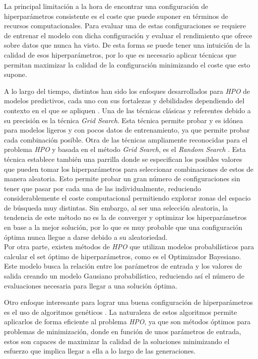 La principal limitación a la hora de encontrar una configuración de hiperparámetros consistente es el coste que puede suponer en términos de recursos computacionales. Para evaluar una de estas configuraciones se requiere de entrenar el modelo con dicha configuración y evaluar el rendimiento que ofrece sobre datos que nunca ha visto. De esta forma se puede tener una intuición de la calidad de esos hiperparámetros, por lo que es necesario aplicar técnicas que permitan maximizar la calidad de la configuración minimizando el coste que esto supone.


A lo largo del tiempo, distintos han sido los enfoques desarrollados para \textit{HPO} de modelos predictivos, cada uno con sus fortalezas y debilidades dependiendo del contexto en el que se apliquen \cite{yu2020hyperparameter}. Una de las técnicas clásicas y referentes debido a su precisión es la técnica \textit{Grid Search}. Esta técnica permite probar y es idónea para modelos ligeros y con pocos datos de entrenamiento, ya que permite probar cada combinación posible. Otra de las técnicas ampliamente reconocidas para el problema \textit{HPO} y basada en el método \textit{Grid Search}, es el \textit{Random Search} \cite{bergstra2012random}. Esta técnica establece también una parrilla donde se especifican los posibles valores que pueden tomar los hiperparámetros para seleccionar combinaciones de estos de manera aleatoria. Esto permite probar un gran número de configuraciones sin tener que pasar por cada una de las individualmente, reduciendo considerablemente el coste computacional permitiendo explorar zonas del espacio de búsqueda muy distintas. Sin embargo, al ser una selección aleatoria, la tendencia de este método no es la de converger y optimizar los hiperparámetros en base a la mejor solución, por lo que es muy probable que una configuración óptima nunca llegue a darse debido a su aleatoriedad.\\
Por otra parte, existen métodos de \textit{HPO} que utilizan modelos probabilísticos para calcular el set óptimo de hiperparámetros, como es el Optimizador Bayesiano. Este modelo busca la relación entre los parámetros de entrada y los valores de salida creando un modelo Gausiano probabilístico, reduciendo así el número de evaluaciones necesaria para llegar a una solución óptima.

Otro enfoque interesante para lograr una buena configuración de hiperparámetros es el uso de algoritmos genéticos \cite{alibrahim2021hyperparameter}. La naturaleza de estos algoritmos permite aplicarlos de forma eficiente al problema \textit{HPO}, ya que son métodos óptimos para problemas de minimización, donde en función de unos parámetros de entrada, estos son capaces de maximizar la calidad de la soluciones minimizando el esfuerzo que implica llegar a ella a lo largo de las generaciones.



